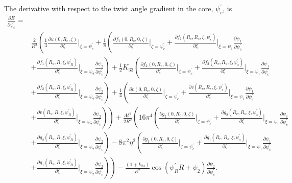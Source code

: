 \documentclass[12pt]{article}
\begin{document}
The derivative with respect to the twist angle gradient in the core, $\psi_c^{\prime}$, is
\begin{align}
\frac{\partial E}{\partial \psi_c^{\prime}}=&\nonumber\\
&\frac{2}{R^2}\left(\frac{1}{4}\frac{\partial u(0,R_c,\zeta)}{\partial\zeta}\bigg|_{\zeta=\psi_c^{\prime}}+\frac{1}{8}\left(\frac{\partial f_1(0,R_c,0,\zeta)}{\partial\zeta}\bigg|_{\zeta=\psi_c^{\prime}}+\frac{\partial f_1(R_c,R_s,\xi,\psi_s^{\prime})}{\partial \xi}\bigg|_{\xi=\psi_1}\frac{\partial\psi_1}{\partial\psi_c^{\prime}}\right.\right.\nonumber\\
&\left.+\frac{\partial f_1(R_s,R,\xi,\psi_R^{\prime})}{\partial\xi}\bigg|_{\xi=\psi_2}\frac{\partial\psi_2}{\partial\psi_c^{\prime}}\right)+\frac{1}{2}K_{33}\left(\frac{\partial f_2(0,R_c,0,\zeta)}{\partial\zeta}\bigg|_{\zeta=\psi_c^{\prime}}+\frac{\partial f_2(R_c,R_s,\xi,\psi_s^{\prime})}{\partial\xi}\bigg|_{\xi=\psi_1}\frac{\partial\psi_1}{\partial\psi_c^{\prime}}\right.\nonumber\\
&\left.+\frac{\partial f_2(R_s,R,\xi,\psi_R^{\prime})}{\partial\xi}\bigg|_{\xi=\psi_2}\frac{\partial\psi_2}{\partial\psi_c^{\prime}}\right)+\frac{1}{4}\left(\frac{\partial v(0,R_c,0,\zeta)}{\partial\zeta}\bigg|_{\zeta=\psi_c^{\prime}}+\frac{\partial v(R_c,R_s,\xi,\psi_s^{\prime})}{\partial\xi}\bigg|_{\xi=\psi_1}\frac{\partial\psi_1}{\partial\psi_c^{\prime}}\right.\nonumber\\
&\left.\left.+\frac{\partial v(R_s,R,\xi,\psi_R^{\prime})}{\partial\xi}\bigg|_{\xi=\psi_2}\frac{\partial\psi_2}{\partial\psi_c^{\prime}}\right)\right)+\frac{\Lambda\delta^2}{2R^2}\left(16\pi^4\left(\frac{\partial g_2(0,R_c,0,\zeta)}{\partial\zeta}\bigg|_{\zeta=\psi_c^{\prime}}+\frac{\partial g_2(R_c,R_s,\xi,\psi_s^{\prime})}{\partial\xi}\bigg|_{\xi=\psi_1}\frac{\partial\psi_1}{\partial\psi_c^{\prime}}\right.\right.\nonumber\\
&\left.+\frac{\partial g_2(R_s,R,\xi,\psi_R^{\prime})}{\partial\xi}\bigg|_{\xi=\psi_2}\frac{\partial\psi_2}{\partial\psi_c^{\prime}}\right)-8\pi^2\eta^2\left(\frac{\partial g_1(0,R_c,0,\zeta)}{\partial\zeta}\bigg|_{\zeta=\psi_c^{\prime}}+\frac{\partial g_1(R_c,R_s,\xi,\psi_s^{\prime})}{\partial\xi}\bigg|_{\xi=\psi_1}\frac{\partial\psi_1}{\partial\psi_c^{\prime}}\right.\nonumber\\
&\left.\left.+\frac{\partial g_1(R_s,R,\xi,\psi_R^{\prime})}{\partial\xi}\bigg|_{\xi=\psi_2}\frac{\partial \psi_2}{\partial\psi_c^{\prime}}\right)\right)-\frac{(1+k_{24})}{R^2}\cos(\psi_R^{\prime}R+\psi_2)\frac{\partial\psi_2}{\partial\psi_c^{\prime}}.\label{eq:dEdpsi_cp}
\end{align}
\end{document}
